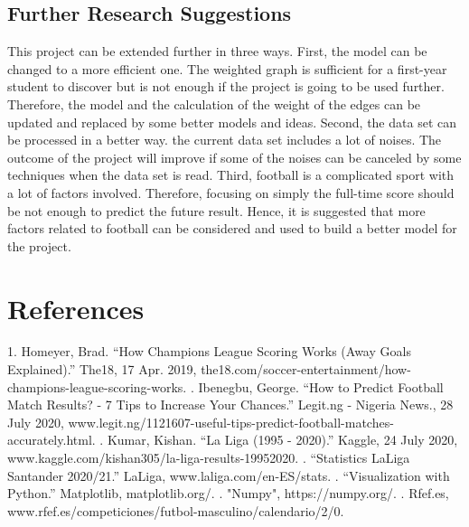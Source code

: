 \documentclass[fontsize=11pt]{article}
\begin{document}
\subsection*{Further Research Suggestions}
This project can be extended further in three ways.
\newline
\newline
First, the model can be changed to a more efficient one. The weighted graph is sufficient for a first-year student to discover but is not enough if the project is going to be used further. Therefore, the model and the calculation of the weight of the edges can be updated and replaced by some better models and ideas. 
\newline
\newline
Second, the data set can be processed in a better way. the current data set includes a lot of noises. The outcome of the project will improve if some of the noises can be canceled by some techniques when the data set is read.
\newline
\newline
Third, football is a complicated sport with a lot of factors involved. Therefore, focusing on simply the full-time score should be not enough to predict the future result. Hence, it is suggested that more factors related to football can be considered and used to build a better model for the project.


\section*{References}
1. Homeyer, Brad. “How Champions League Scoring Works (Away Goals Explained).” The18, 17 Apr. 2019, the18.com/soccer-entertainment/how-champions-league-scoring-works. 
\newline
{}. Ibenegbu, George. “How to Predict Football Match Results? - 7 Tips to Increase Your Chances.” Legit.ng - Nigeria News., 28 July 2020, www.legit.ng/1121607-useful-tips-predict-football-matches-accurately.html. 
\newline
{}. Kumar, Kishan. “La Liga (1995 - 2020).” Kaggle, 24 July 2020, www.kaggle.com/kishan305/la-liga-results-19952020. 
\newline
{}. “Statistics LaLiga Santander 2020/21.” LaLiga, www.laliga.com/en-ES/stats. 
\newline
{}. “Visualization with Python.” Matplotlib, matplotlib.org/. 
\newline
{}. "Numpy", https://numpy.org/.
\newline
{}. Rfef.es, www.rfef.es/competiciones/futbol-masculino/calendario/2/0. 


\end{document}
